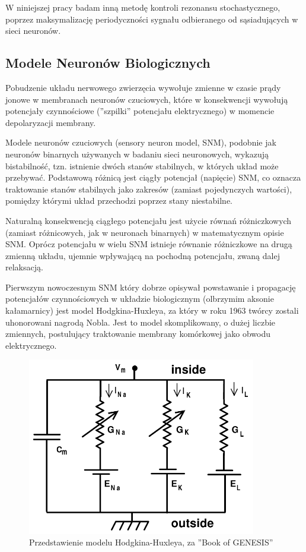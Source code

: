   W niniejszej pracy badam inną metodę kontroli rezonansu stochastycznego, poprzez maksymalizację periodyczności sygnału odbieranego od sąsiadujących w sieci neuronów.

  
  \subsection{Modele Neuronów Biologicznych}
  
  Pobudzenie układu nerwowego zwierzęcia wywołuje zmienne w czasie prądy jonowe w membranach neuronów czuciowych, które w konsekwencji wywołują potencjały czynnościowe (''szpilki'' potencjału elektrycznego) w momencie depolaryzacji membrany.
  
  Modele neuronów czuciowych (sensory neuron model, SNM), podobnie jak neuronów binarnych używanych w badaniu sieci neuronowych, wykazują bistabilność, tzn. istnienie dwóch stanów stabilnych, w których układ może przebywać. Podstawową różnicą jest ciągły potencjał (napięcie) SNM, co oznacza traktowanie stanów stabilnych jako zakresów (zamiast pojedynczych wartości), pomiędzy którymi układ przechodzi poprzez stany niestabilne. 
  
  Naturalną konsekwencją ciągłego potencjału jest użycie równań różniczkowych (zamiast różnicowych, jak w neuronach binarnych) w matematycznym opisie SNM. Oprócz potencjału w wielu SNM istnieje równanie różniczkowe na drugą zmienną układu, ujemnie wpływającą na pochodną potencjału, zwaną dalej relaksacją.
  
  Pierwszym nowoczesnym SNM który dobrze opisywał powstawanie i propagację potencjałów czynnościowych w układzie biologicznym (olbrzymim aksonie kałamarnicy) jest model Hodgkina-Huxleya, za który w roku 1963 twórcy zostali uhonorowani nagrodą Nobla. Jest to model skomplikowany, o dużej liczbie zmiennych, postulujący traktowanie membrany komórkowej jako obwodu elektrycznego.

  \begin{figure}
    \includegraphics[width=100mm]{images/hh.png}
    \caption{Przedstawienie modelu Hodgkina-Huxleya, za ''Book of GENESIS'' \cite{genesis}}
    \label{fig:graphics:genesis}
  \end{figure}

